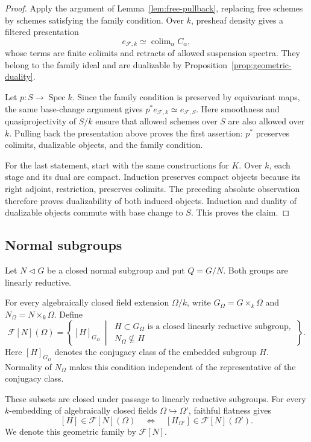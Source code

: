 \documentclass[11pt,reqno]{amsart}
\theoremstyle{definition}
\theoremstyle{remark}
\theoremstyle{plain}
\numberwithin{equation}{section}
\DeclareMathOperator{\Spec}{Spec}
\DeclareMathOperator*{\colim}{colim}
\newcommand{\F}{\mathcal F}
\begin{document}
\begin{proof}
Apply the argument of Lemma~\ref{lem:free-pullback}, replacing
free schemes by schemes satisfying the family condition.
Over \(k\), presheaf density gives a filtered presentation
\[
 e_{\F,k}\simeq\colim_\alpha C_\alpha,
\]
whose terms are finite colimits and retracts of allowed suspension
spectra. They belong to the family ideal and are dualizable by
Proposition~\ref{prop:geometric-duality}.

Let \(p:S\to\Spec k\).
Since the family condition is preserved by equivariant maps,
the same base-change argument gives
\(p^*e_{\F,k}\simeq e_{\F,S}\).
Here smoothness and quasiprojectivity of \(S/k\) ensure that
allowed schemes over \(S\) are also allowed over \(k\).
Pulling back the presentation above proves the first assertion:
\(p^*\) preserves colimits, dualizable objects, and the family
condition.

For the last statement, start with the same constructions for
\(K\).
Over \(k\), each stage and its dual are compact.
Induction preserves compact objects because its right adjoint,
restriction, preserves colimits.
The preceding absolute observation therefore proves dualizability of
both induced objects.
Induction and duality of dualizable objects commute with base change
to \(S\). This proves the claim.
\end{proof}


\subsection{Normal subgroups}

Let \(N\triangleleft G\) be a closed normal subgroup and put
\(Q=G/N\). Both groups are linearly reductive.

For every algebraically closed field extension \(\Omega/k\), write
\(G_\Omega=G\times_k\Omega\) and \(N_\Omega=N\times_k\Omega\).
Define
\[
 \F[N](\Omega)=
 \left\{
 [H]_{G_\Omega}\ \middle|\
 \begin{array}{l}
 H\subset G_\Omega\text{ is a closed linearly reductive subgroup},\\
 N_\Omega\not\subseteq H
 \end{array}
 \right\}.
\]
Here \([H]_{G_\Omega}\) denotes the conjugacy class of the
embedded subgroup \(H\).
Normality of \(N_\Omega\) makes this condition independent
of the representative of the conjugacy class.

These subsets are closed under passage to linearly reductive
subgroups. For every \(k\)-embedding of algebraically closed
fields \(\Omega\hookrightarrow\Omega'\), faithful flatness gives
\[
 [H]\in\F[N](\Omega)
 \quad\Longleftrightarrow\quad
 [H_{\Omega'}]\in\F[N](\Omega').
\]
We denote this geometric family by \(\F[N]\).
\end{document}
